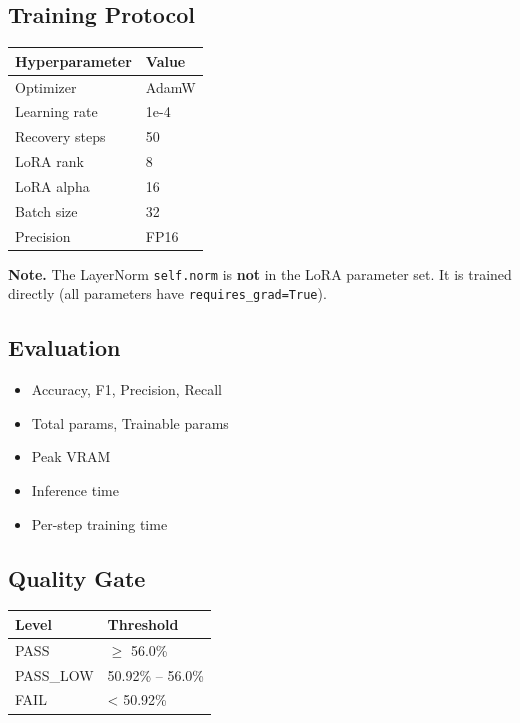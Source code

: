 \subsection{Training Protocol}

\begin{table}[H]
\centering
\small
\begin{tabular}{ll}
\toprule
\textbf{Hyperparameter} & \textbf{Value} \\
\midrule
Optimizer & AdamW \\
Learning rate & 1e-4 \\
Recovery steps & 50 \\
LoRA rank & 8 \\
LoRA alpha & 16 \\
Batch size & 32 \\
Precision & FP16 \\
\bottomrule
\end{tabular}
\end{table}

\textbf{Note.} The LayerNorm \texttt{self.norm} is \textbf{not} in the LoRA parameter set. 
It is trained directly (all parameters have \texttt{requires\_grad=True}).

\subsection{Evaluation}

\begin{itemize}
\item Accuracy, F1, Precision, Recall
\item Total params, Trainable params
\item Peak VRAM
\item Inference time
\item Per-step training time

\end{itemize}
\subsection{Quality Gate}

\begin{table}[H]
\centering
\small
\begin{tabular}{ll}
\toprule
\textbf{Level} & \textbf{Threshold} \\
\midrule
PASS & $\ge$ 56.0\% \\
PASS\_LOW & 50.92\% -- 56.0\% \\
FAIL & \textless{} 50.92\% \\
\bottomrule
\end{tabular}
\end{table}

